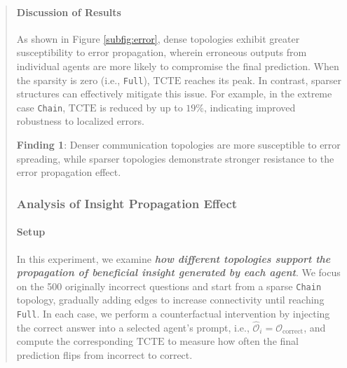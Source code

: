 \documentclass[11pt]{article}
\begin{document}
\begin{abstract}
\paragraph{Discussion of Results} 
As shown in Figure \ref{subfig:error}, dense topologies exhibit greater susceptibility to error propagation, wherein erroneous outputs from individual agents are more likely to compromise the final prediction. When the sparsity is zero (i.e., \texttt{Full}), $\text{TCTE}$ reaches its peak. In contrast, sparser structures can effectively mitigate this issue. For example, in the extreme case \texttt{Chain}, $\text{TCTE}$ is reduced by up to $19\%$, indicating improved robustness to localized errors. %
\begin{tcolorbox}[
    enhanced, %
    colback=white, %
    colframe=deepgreen, %
    boxrule=1pt, %
    arc=5pt, %
    left=5pt, right=5pt, %
    top=5pt, bottom=5pt, %
    width=\linewidth %
]
\textbf{\textcolor{deepgreen}{Finding 1}}: Denser communication topologies are more susceptible to error spreading, while sparser topologies demonstrate stronger resistance to the error propagation effect. %
\end{tcolorbox}

\subsubsection{Analysis of Insight Propagation Effect}

\paragraph{Setup} 
In this experiment, we examine \textit{\textbf{how different topologies support the propagation of beneficial insight generated by each agent}}. We focus on the 500 originally incorrect questions and start from a sparse \texttt{Chain} topology, gradually adding edges to increase connectivity until reaching \texttt{Full}. In each case, we perform a counterfactual intervention by injecting the correct answer into a selected agent’s prompt, i.e., $\hat{\mathcal{{O}}}_i = \mathcal{{O}}_{\text{correct}}$, and compute the corresponding $\text{TCTE}$ to measure how often the final prediction flips from incorrect to correct.


\end{abstract}
\end{document}
